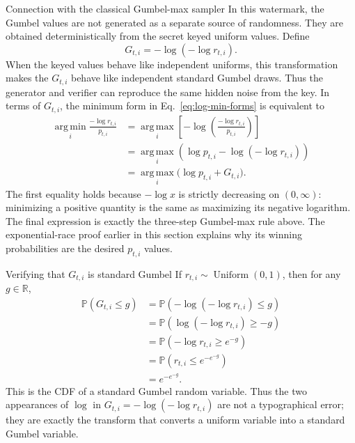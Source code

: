 \documentclass[11pt]{article}
\DeclareRobustCommand{\iperpaper}[2]{%
  \begingroup
  \hypersetup{pdfborder=0 0 0}%
  \href{iperpaper:#1}{{\color{iperpaperlink}#2}}%
  \endgroup
}
\def\iperpaper#1#2{#2}%
\newcommand{\U}{\operatorname{Uniform}}
\newcommand{\Pp}{\mathbb{P}}
\newcommand{\argmax}{\operatorname*{arg\,max}}
\newcommand{\argmin}{\operatorname*{arg\,min}}
\begin{document}
\begin{leveltwo}{Connection with the classical Gumbel-max sampler}
In this watermark, the Gumbel values are not generated as a separate source of randomness. They are obtained deterministically from the secret keyed uniform values. Define
\[
  \iperpaper{gumbel_noise}{G_{t,i}=-\log(-\log r_{t,i})}.
\]
When the keyed values behave like independent uniforms, this transformation makes the $G_{t,i}$ behave like independent standard Gumbel draws. Thus the generator and verifier can reproduce the same hidden noise from the key. In terms of $G_{t,i}$, the minimum form in Eq.~\eqref{eq:log-min-forms} is equivalent to
\begin{align*}
\iperpaper{argmin_symbol}{\argmin}_i\frac{-\log r_{t,i}}{p_{t,i}}
&=\iperpaper{argmax_symbol}{\argmax}_i\left[-\log\left(\frac{-\log r_{t,i}}{p_{t,i}}\right)\right]\\
&=\iperpaper{argmax_symbol}{\argmax}_i\left(\log p_{t,i}-\log(-\log r_{t,i})\right)\\
&=\iperpaper{argmax_symbol}{\argmax}_i\bigl(\log p_{t,i}+G_{t,i}\bigr).
\end{align*}
The first equality holds because $-\log x$ is strictly decreasing on $(0,\infty)$: minimizing a positive quantity is the same as maximizing its negative logarithm. The final expression is exactly the three-step Gumbel-max rule above. The exponential-race proof earlier in this section explains why its winning probabilities are the desired $p_{t,i}$ values.

\end{leveltwo}

\begin{leveltwo}{Verifying that \texorpdfstring{$G_{t,i}$}{Gti} is standard Gumbel}
If $r_{t,i}\sim\iperpaper{uniform_symbol}{\U}(0,1)$, then for any $g\in\mathbb R$,
\begin{align*}
\Pp(G_{t,i}\le g)
&=\Pp\!\left(-\log(-\log r_{t,i})\le g\right)\\
&=\Pp\!\left(\log(-\log r_{t,i})\ge -g\right)\\
&=\Pp\!\left(-\log r_{t,i}\ge e^{-g}\right)\\
&=\Pp\!\left(r_{t,i}\le e^{-e^{-g}}\right)\\
&=e^{-e^{-g}}.
\end{align*}
This is the \iperpaper{cdf_name}{CDF} of a standard Gumbel random variable. Thus the two appearances of $\log$ in $G_{t,i}=-\log(-\log r_{t,i})$ are not a typographical error; they are exactly the transform that converts a uniform variable into a standard Gumbel variable.
\end{leveltwo}
\end{document}
